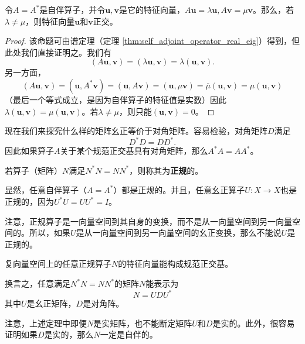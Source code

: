 \begin{proposition}
    令$A=A^*$是自伴算子，并令$\mathbf{u},\mathbf{v}$是它的特征向量，$A\mathbf{u}=\lambda\mathbf{u},A\mathbf{v}=\mu\mathbf{v}$。那么，若$\lambda\ne\mu$，则特征向量$\mathbf{u}$和$\mathbf{v}$正交。
\end{proposition}
\begin{proof}
    该命题可由谱定理（定理 \ref{thm:self_adjoint_operator_real_eig}）得到，但此处我们直接证明之。我们有\[(A\mathbf{u},\mathbf{v})=(\lambda\mathbf{u},\mathbf{v})=\lambda(\mathbf{u},\mathbf{v}).\]
    另一方面，\[(A\mathbf{u},\mathbf{v})=(\mathbf{u},A^*\mathbf{v})=(\mathbf{u},A\mathbf{v})=(\mathbf{u},\mu\mathbf{v})=\overline{\mu}(\mathbf{u},\mathbf{v})=\mu(\mathbf{u},\mathbf{v})\]
    （最后一个等式成立，是因为自伴算子的特征值是实数）因此$\lambda(\mathbf{u},\mathbf{v})=\mu(\mathbf{u},\mathbf{v})$。若$\lambda\ne \mu$，则只能$(\mathbf{u},\mathbf{v})=0$。
\end{proof}

现在我们来探究什么样的矩阵幺正等价于对角矩阵。容易检验，对角矩阵$D$满足\[D^*D=DD^*.\]因此如果算子$A$关于某个规范正交基具有对角矩阵，那么$A^*A=AA^*$。

\begin{definition*}
    若算子（矩阵）$N$满足$N^*N=NN^*$，则称其为{\bf 正规}的。
\end{definition*}

显然，任意自伴算子（$A=A^*$）都是正规的。并且，任意幺正算子$U:X\to X$也是正规的，因为$U^*U=UU^*=I$。

注意，正规算子是一向量空间到其自身的变换，而不是从一向量空间到另一向量空间的。所以，如果$U$是从一向量空间到另一向量空间的幺正变换，那么不能说$U$是正规的。

\begin{theorem}\label{thm:normal_diag}
    复向量空间上的任意正规算子$N$的特征向量能构成规范正交基。

    换言之，任意满足$N^*N=NN^*$的矩阵$N$能表示为\[N=UDU^*\]其中$U$是幺正矩阵，$D$是对角阵。
\end{theorem}

\begin{remark*}
    注意，上述定理中即便$N$是实矩阵，也不能断定矩阵$U$和$D$是实的。此外，很容易证明如果$D$是实的，那么$N$一定是自伴的。
\end{remark*}

